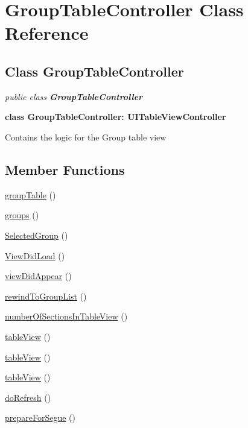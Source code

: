 
\hypertarget{class_GroupTableController.iOS}{\section{GroupTableController Class Reference}
\label{class_GroupTableController.iOS}
}

\subsection*{Class GroupTableController}

\textit{public class \textbf{GroupTableController}}

\tab \textbf{class GroupTableController: UITableViewController}

Contains the logic for the Group table view\\

\subsection*{Member Functions}
\begin{DoxyCompactItemize}
\item 
\hyperlink{class_GroupTableController.iOS.groupTable}{groupTable} ()
\item 
\hyperlink{class_GroupTableController.iOS.groups}{groups} ()
\item 
\hyperlink{class_GroupTableController.iOS.SelectedGroup}{SelectedGroup} ()
\item 
\hyperlink{class_GroupTableController.iOS.viewDidLoad}{ViewDidLoad} ()
\item 
\hyperlink{class_GroupTableController.iOS.viewDidAppear}{viewDidAppear} ()
\item 
\hyperlink{class_GroupTableController.iOS.rewindToGroupList}{rewindToGroupList} ()
\item 
\hyperlink{class_GroupTableController.iOS.numberOfSectionsInTableView}{numberOfSectionsInTableView} ()
\item 
\hyperlink{class_GroupTableController.iOS.tableView}{tableView} ()
\item 
\hyperlink{class_GroupTableController.iOS.tableView}{tableView} ()
\item 
\hyperlink{class_GroupTableController.iOS.tableView}{tableView} ()
\item 
\hyperlink{class_GroupTableController.iOS.doRefresh}{doRefresh} ()
\item 
\hyperlink{class_GroupTableController.iOS.prepareForSegue}{prepareForSegue} ()
\end{DoxyCompactItemize}





